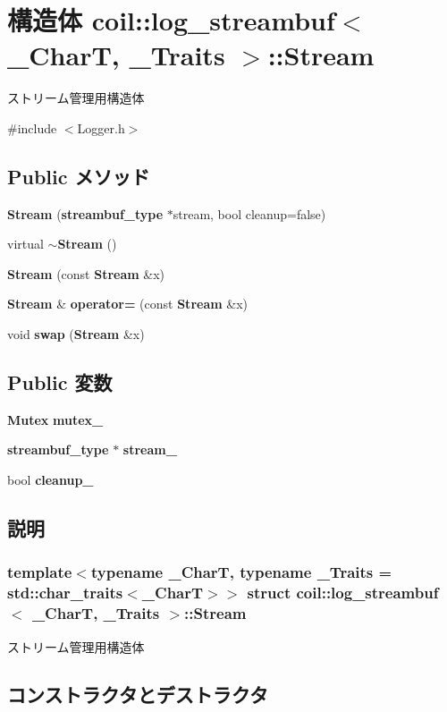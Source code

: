 \section{構造体 coil::log\_\-streambuf$<$ \_\-CharT, \_\-Traits $>$::Stream}
\label{structcoil_1_1log__streambuf_1_1Stream}


ストリーム管理用構造体  




{\ttfamily \#include $<$Logger.h$>$}

\subsection*{Public メソッド}
\begin{DoxyCompactItemize}
\item 
{\bf Stream} ({\bf streambuf\_\-type} $\ast$stream, bool cleanup=false)
\item 
virtual {\bf $\sim$Stream} ()
\item 
{\bf Stream} (const {\bf Stream} \&x)
\item 
{\bf Stream} \& {\bf operator=} (const {\bf Stream} \&x)
\item 
void {\bf swap} ({\bf Stream} \&x)
\end{DoxyCompactItemize}
\subsection*{Public 変数}
\begin{DoxyCompactItemize}
\item 
{\bf Mutex} {\bf mutex\_\-}
\item 
{\bf streambuf\_\-type} $\ast$ {\bf stream\_\-}
\item 
bool {\bf cleanup\_\-}
\end{DoxyCompactItemize}


\subsection{説明}
\subsubsection*{template$<$typename \_\-CharT, typename \_\-Traits = std::char\_\-traits$<$\_\-CharT$>$$>$ struct coil::log\_\-streambuf$<$ \_\-CharT, \_\-Traits $>$::Stream}

ストリーム管理用構造体 

\subsection{コンストラクタとデストラクタ}
